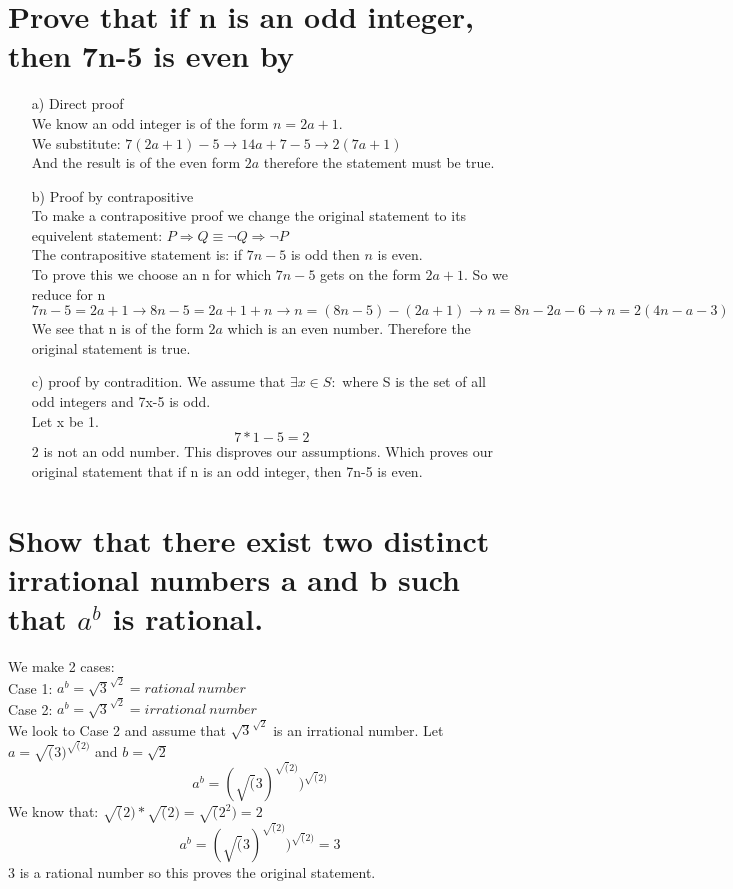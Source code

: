 \section{Prove that if n is an odd integer, then 7n-5 is even by}
\begin{itemize}
\item[a)] Direct proof\\
We know an odd integer is of the form $n=2a+1$.\\
We substitute: $7(2a+1)-5\rightarrow14a+7-5\rightarrow2(7a+1)$\\
And the result is of the even form $2a$ therefore the statement must be true.
\item[b)] Proof by contrapositive\\
To make a contrapositive proof we change the original statement to its equivelent statement: $P \Rightarrow Q \equiv \neg Q \Rightarrow \neg P$\\
The contrapositive statement is: if $7n-5$ is odd then $n$ is even.\\
To prove this we choose an n for which $7n-5$ gets on the form $2a+1$. So we reduce for n $7n-5=2a+1 \rightarrow 8n-5=2a+1+n \rightarrow n=(8n-5)-(2a+1) \rightarrow n=8n-2a-6 \rightarrow n=2(4n-a-3)$\\
We see that n is of the form $2a$ which is an even number. Therefore the original statement is true.
\item[c)] proof by contradition.
We assume that $\exists x \in S:$ where S is the set of all odd integers and 7x-5 is odd.\\
Let x be 1.
\begin{equation}
7*1-5 = 2
\end{equation}
2 is not an odd number.
This disproves our assumptions.
Which proves our original statement that if n is an odd integer, then 7n-5 is even.
\end{itemize}

\section{Show that there exist two distinct irrational numbers a and b such that $a^b$ is rational.}
We make 2 cases:\\
Case 1: $a^b = \sqrt{3}^{\sqrt{2}} = rational\ number$\\
Case 2: $a^b = \sqrt{3}^{\sqrt{2}} = irrational\ number$\\
We look to Case 2 and assume that $\sqrt{3}^{\sqrt{2}}$ is an irrational number.
Let $a = \sqrt(3)^{\sqrt(2)}$ and $b = \sqrt{2}$
\begin{equation}
a^b = (\sqrt(3)^{\sqrt(2)})^{\sqrt(2)}
\end{equation}
We know that: $\sqrt(2)*\sqrt(2) = \sqrt(2^2) = 2$\\
\begin{equation}
a^b = (\sqrt(3)^{\sqrt(2)})^{\sqrt(2)} = 3
\end{equation}
3 is a rational number so this proves the original statement.

